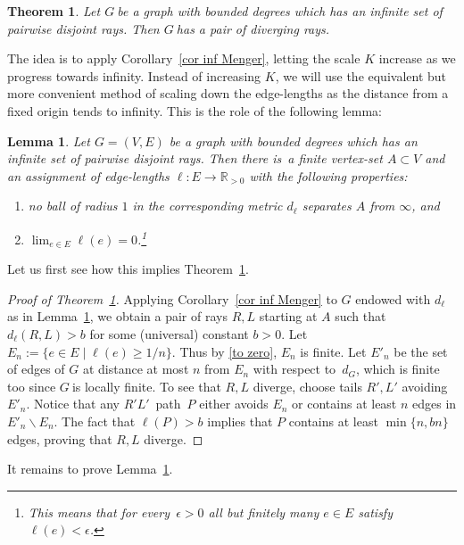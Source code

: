 \documentclass[a4paper]{article}
\newtheorem{theorem}[proposition]{Theorem}
\newtheorem{lemma}[proposition]{Lemma}
\newcommand{\R}{\ensuremath{\mathbb R}}
\newcommand{\sm}{\backslash}
\newcommand{\pth}[2]{\ensuremath{#1}\text{--}\ensuremath{#2}~path}
\newcommand{\g}{\ensuremath{G\ }}
\newcommand{\Lr}[1]{Lemma~\ref{#1}}
\newcommand{\Tr}[1]{Theorem~\ref{#1}}
\newcommand{\Cr}[1]{Corollary~\ref{#1}}
\newcommand{\lf}{locally finite}
\newcommand{\fe}{for every}
\newcommand{\st}{such that}
\newcommand{\ti}{there is}
\newcommand{\wrt}{with respect to}
\begin{document}
\begin{theorem} \label{thm div rays}
Let \g be a graph with bounded degrees which has an infinite set of pairwise disjoint rays. Then \g has a pair of diverging rays. 
\end{theorem}

The idea is to apply \Cr{cor inf Menger}, letting the scale $K$ increase as we progress towards infinity. Instead of increasing $K$, we will use the equivalent but more convenient method of scaling down the edge-lengths as the distance from a fixed origin tends to infinity. This is the role of the following lemma:

\begin{lemma} \label{lem balls}
Let $G=(V,E)$ be a graph with bounded degrees which has an infinite set of pairwise disjoint rays. Then \ti\ a finite vertex-set $A\subset V$ and an assignment of edge-lengths $\ell : E \to \R_{>0}$ with the following properties: 
\begin{enumerate}
\item \label{non sep} no ball of radius $1$ in the corresponding metric $d_\ell$ separates $A$ from $\infty$, and
\item \label{to zero} $\lim_{e\in E} \ell(e) = 0$.\footnote{This means that \fe\ $\epsilon>0$ all but finitely many $e\in E$ satisfy $\ell(e)<\epsilon$.}
\end{enumerate}
\end{lemma}

Let us first see how this implies \Tr{thm div rays}.

\begin{proof}[Proof of \Tr{thm div rays}]
Applying \Cr{cor inf Menger} to $G$ endowed with $d_\ell$ as in \Lr{lem balls}, we obtain a pair of rays $R,L$ starting at $A$ \st\ $d_\ell(R,L)>b$ for some (universal) constant $b>0$. Let $E_n:= \{e\in E \mid \ell(e)\geq 1/n\}$. Thus by \ref{to zero}, $E_n$ is finite. Let $E'_n$ be the set of edges of $G$ at distance at most $n$ from $E_n$ \wrt\ $d_G$, which is finite too since \g is \lf. To see that $R,L$ diverge, choose tails $R',L'$ avoiding $E'_n$. 
Notice that any  \pth{R'}{L'}\ $P$ either avoids $E_n$ or contains at least $n$ edges in $E'_n \sm E_n$. The fact that $\ell(P)>b$ implies that $P$ contains at least $\min\{n,bn\}$ edges, proving that $R,L$ diverge.  
\end{proof}

It remains to prove \Lr{lem balls}.
\end{document}
